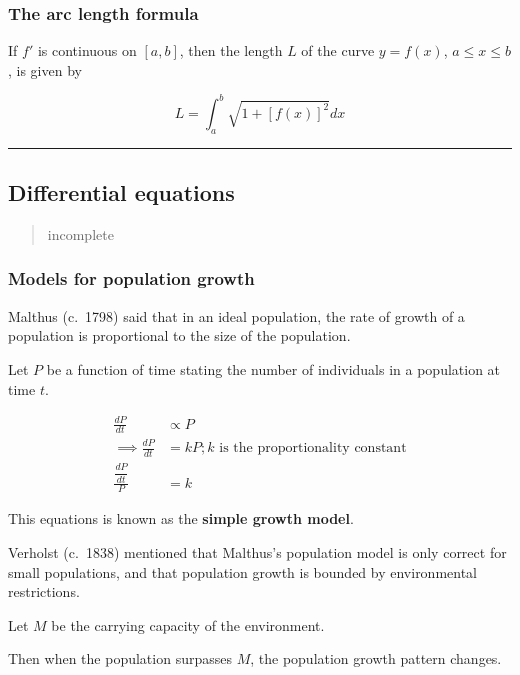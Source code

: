 \documentclass[
]{article}
\begin{document}
\hypertarget{the-arc-length-formula}{%
\subsubsection{The arc length formula}\label{the-arc-length-formula}}

If \(f'\) is continuous on \([a,b]\), then the length \(L\) of the curve
\(y = f(x)\), \(a \leq x \leq b\), is given by

\[ L = \int_a^b \sqrt{1+[f(x)]^2}dx \]

\begin{center}\rule{0.5\linewidth}{0.5pt}\end{center}

\hypertarget{differential-equations}{%
\subsection{Differential equations}\label{differential-equations}}

\begin{quote}
incomplete
\end{quote}

\hypertarget{models-for-population-growth}{%
\subsubsection{Models for population
growth}\label{models-for-population-growth}}

Malthus (c.~1798) said that in an ideal population, the rate of growth
of a population is proportional to the size of the population.

Let \(P\) be a function of time stating the number of individuals in a
population at time \(t\).

\begin{align*}
\frac{dP}{dt} &\propto P\\
\implies\frac{dP}{dt} &= kP; k \text{ is the proportionality constant}\\
\frac{\dfrac{dP}{dt}}{P} &= k
\end{align*}

This equations is known as the \textbf{simple growth model}.

Verholst (c.~1838) mentioned that Malthus's population model is only
correct for small populations, and that population growth is bounded by
environmental restrictions.

Let \(M\) be the carrying capacity of the environment.

Then when the population surpasses \(M\), the population growth pattern
changes.
\end{document}
